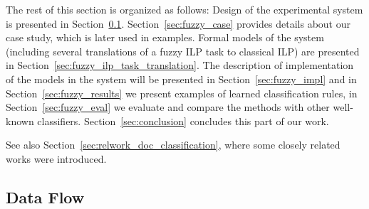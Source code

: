 The rest of this section is organized as follows: Design of the experimental system is presented in Section~\ref{sec:fuzzy_system}. %
Section~\ref{sec:fuzzy_case} provides details about our case study, which is later used in examples. Formal models of the system (including several translations of a fuzzy ILP task to classical ILP) are presented in Section~\ref{sec:fuzzy_ilp_task_translation}. The description of implementation of the models in the system will be presented in Section~\ref{sec:fuzzy_impl} and in Section~\ref{sec:fuzzy_results} we present examples of learned classification rules, in Section~\ref{sec:fuzzy_eval} we evaluate and compare the methods with other well-known classifiers. Section~\ref{sec:conclusion} concludes this part of our work.

See also Section~\ref{sec:relwork_doc_classification}, where some closely related works were introduced. 

 



\subsection{Data Flow} \label{sec:fuzzy_system}


